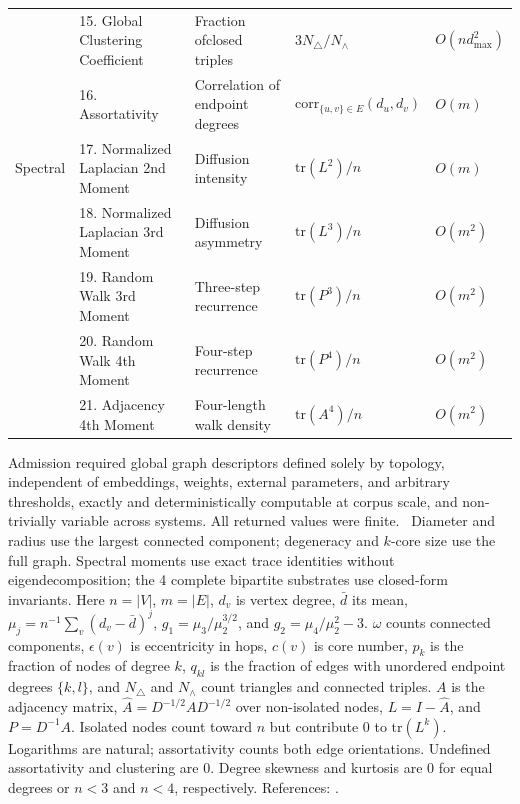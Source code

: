 \documentclass{article}
\begin{document}
\begin{table}[H]
\begin{tabularx}{\linewidth}{@{}ll>{\raggedright\arraybackslash}Xll@{}}
 & 15. Global Clustering Coefficient & Fraction of\newline closed triples & $3 N_{\triangle} / N_{\wedge}$ & $O(n d_{\max}^2)$ \\
 & 16. Assortativity & Correlation of endpoint degrees & $\mathrm{corr}_{\{u,v\} \in E}(d_u, d_v)$ & $O(m)$ \\
\addlinespace
Spectral & 17. Normalized Laplacian 2nd Moment & Diffusion intensity & $\mathrm{tr}(L^2)/n$ & $O(m)$ \\
 & 18. Normalized Laplacian 3rd Moment & Diffusion asymmetry & $\mathrm{tr}(L^3)/n$ & $O(m^2)$ \\
 & 19. Random Walk 3rd Moment & Three-step recurrence & $\mathrm{tr}(P^3)/n$ & $O(m^2)$ \\
 & 20. Random Walk 4th Moment & Four-step recurrence & $\mathrm{tr}(P^4)/n$ & $O(m^2)$ \\
 & 21. Adjacency 4th Moment & Four-length walk density & $\mathrm{tr}(A^4)/n$ & $O(m^2)$ \\
\bottomrule
\end{tabularx}
\par\vspace{12pt}
\begin{minipage}{\linewidth}
\footnotesize
Admission required global graph descriptors defined solely by topology, independent of embeddings, weights, external parameters, and arbitrary thresholds, exactly and deterministically computable at corpus scale, and non-trivially variable across systems. All returned values were finite. \dag~Diameter and radius use the largest connected component; degeneracy and $k$-core size use the full graph. Spectral moments use exact trace identities without eigendecomposition; the 4 complete bipartite substrates use closed-form invariants. Here $n = |V|$, $m = |E|$, $d_v$ is vertex degree, $\bar{d}$ its mean, $\mu_j = n^{-1} \sum_v (d_v - \bar{d})^j$, $g_1 = \mu_3 / \mu_2^{3/2}$, and $g_2 = \mu_4 / \mu_2^{2} - 3$. $\omega$ counts connected components, $\epsilon(v)$ is eccentricity in hops, $c(v)$ is core number, $p_k$ is the fraction of nodes of degree $k$, $q_{kl}$ is the fraction of edges with unordered endpoint degrees $\{k, l\}$, and $N_{\triangle}$ and $N_{\wedge}$ count triangles and connected triples. $A$ is the adjacency matrix, $\hat{A} = D^{-1/2} A D^{-1/2}$ over non-isolated nodes, $L = I - \hat{A}$, and $P = D^{-1} A$. Isolated nodes count toward $n$ but contribute 0 to $\mathrm{tr}(L^k)$. Logarithms are natural; assortativity counts both edge orientations. Undefined assortativity and clustering are 0. Degree skewness and kurtosis are 0 for equal degrees or $n < 3$ and $n < 4$, respectively. References: \citep{ref49,ref50,ref51,ref52,ref61,ref62,ref63,ref64,ref79,ref112,ref114}.
\end{minipage}
\end{table}
\end{document}

